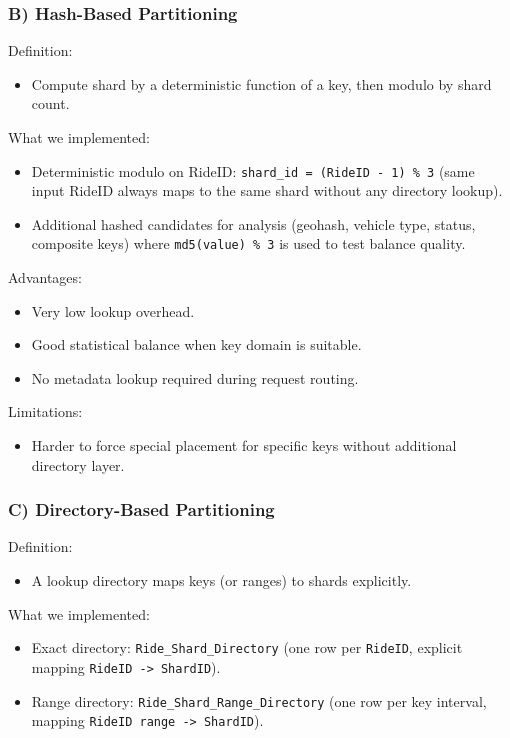 \documentclass[12pt]{article}
\begin{document}
\subsubsection*{B) Hash-Based Partitioning}

Definition:
\begin{itemize}
    \item Compute shard by a deterministic function of a key, then modulo by shard count.
\end{itemize}

What we implemented:
\begin{itemize}
    \item Deterministic modulo on RideID: \texttt{shard\_id = (RideID - 1) \% 3} (same input RideID always maps to the same shard without any directory lookup).
    \item Additional hashed candidates for analysis (geohash, vehicle type, status, composite keys) where \texttt{md5(value) \% 3} is used to test balance quality.
\end{itemize}

Advantages:
\begin{itemize}
    \item Very low lookup overhead.
    \item Good statistical balance when key domain is suitable.
    \item No metadata lookup required during request routing.
\end{itemize}

Limitations:
\begin{itemize}
    \item Harder to force special placement for specific keys without additional directory layer.
\end{itemize}

\subsubsection*{C) Directory-Based Partitioning}

Definition:
\begin{itemize}
    \item A lookup directory maps keys (or ranges) to shards explicitly.
\end{itemize}

What we implemented:
\begin{itemize}
    \item Exact directory: \texttt{Ride\_Shard\_Directory} (one row per \texttt{RideID}, explicit mapping \texttt{RideID -> ShardID}).
    \item Range directory: \texttt{Ride\_Shard\_Range\_Directory} (one row per key interval, mapping \texttt{RideID range -> ShardID}).
\end{itemize}
\end{document}
